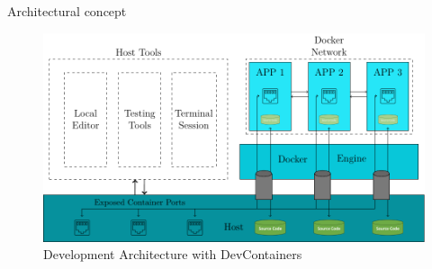 \documentclass{beamer}
\begin{document}


\begin{frame}{}
  \vspace{-0.2cm}
  \begin{center}
    \large Architectural concept
  \end{center}
  \vspace{-0.4cm}
  \begin{figure}
    \includegraphics[width=\textwidth]{img/thesis_main-figure2.pdf}
    \caption{Development Architecture with DevContainers}
  \end{figure}
\end{frame}



\end{document}
